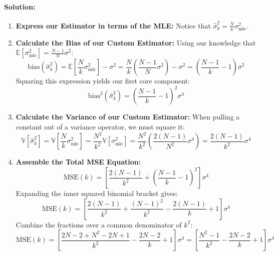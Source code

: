 \documentclass{article}
\begin{document}
\paragraph{Solution:}
\begin{enumerate}
    \item \textbf{Express our Estimator in terms of the MLE:}
    Notice that $\hat{\sigma}^2_k = \frac{N}{k}\sigma^2_{\text{mle}}$.
    
    \item \textbf{Calculate the Bias of our Custom Estimator:}
    Using our knowledge that $\mathbb{E}[\sigma^2_{\text{mle}}] = \frac{N-1}{N}\sigma^2$:
    \begin{equation}
    \text{bias}(\hat{\sigma}^2_k) = \mathbb{E}\left[\frac{N}{k}\sigma^2_{\text{mle}}\right] - \sigma^2 = \frac{N}{k}\left(\frac{N-1}{N}\sigma^2\right) - \sigma^2 = \left(\frac{N-1}{k} - 1\right)\sigma^2
    \end{equation}
    Squaring this expression yields our first core component:
    \begin{equation}
    \text{bias}^2(\hat{\sigma}^2_k) = \left(\frac{N-1}{k} - 1\right)^2 \sigma^4
    \end{equation}
    
    \item \textbf{Calculate the Variance of our Custom Estimator:}
    When pulling a constant out of a variance operator, we must square it:
    \begin{equation}
    \mathbb{V}\left[\hat{\sigma}^2_k\right] = \mathbb{V}\left[\frac{N}{k}\sigma^2_{\text{mle}}\right] = \frac{N^2}{k^2}\mathbb{V}\left[\sigma^2_{\text{mle}}\right] = \frac{N^2}{k^2}\left(\frac{2(N-1)}{N^2}\sigma^4\right) = \frac{2(N-1)}{k^2}\sigma^4
    \end{equation}
    
    \item \textbf{Assemble the Total MSE Equation:}
    \begin{equation}
    \text{MSE}(k) = \left[ \frac{2(N-1)}{k^2} + \left(\frac{N-1}{k} - 1\right)^2 \right] \sigma^4
    \end{equation}
    Expanding the inner squared binomial bracket gives:
    \begin{equation}
    \text{MSE}(k) = \left[ \frac{2(N-1)}{k^2} + \frac{(N-1)^2}{k^2} - \frac{2(N-1)}{k} + 1 \right] \sigma^4
    \end{equation}
    Combine the fractions over a common denominator of $k^2$:
    \begin{equation}
    \text{MSE}(k) = \left[ \frac{2N - 2 + N^2 - 2N + 1}{k^2} - \frac{2N - 2}{k} + 1 \right] \sigma^4 = \left[ \frac{N^2 - 1}{k^2} - \frac{2N - 2}{k} + 1 \right] \sigma^4
    \end{equation}
    

\end{enumerate}
\end{document}
